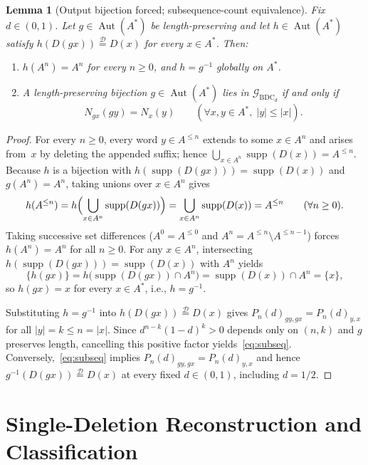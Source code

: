 \documentclass[11pt]{article}
\theoremstyle{plain}
\newtheorem{lemma}[theorem]{Lemma}
\theoremstyle{definition}
\theoremstyle{remark}
\DeclareMathOperator{\Aut}{Aut}
\DeclareMathOperator{\supp}{supp}
\DeclareMathOperator{\BDC}{BDC}
\newcommand{\eqdist}{\stackrel{\mathcal{D}}{=}}
\begin{document}
\begin{lemma}[Output bijection forced; subsequence-count equivalence]\label{lem:forced-h}
Fix $d \in (0, 1)$. Let $g \in \Aut(A^*)$ be length-preserving and let $h \in \Aut(A^*)$ satisfy $h(D(gx)) \eqdist D(x)$ for every $x \in A^*$. Then:
\begin{enumerate}[label=\textup{(\arabic*)},nosep]
\item $h(A^n) = A^n$ for every $n \ge 0$, and $h = g^{-1}$ globally on $A^*$.
\item A length-preserving bijection $g \in \Aut(A^*)$ lies in $\mathcal{G}_{\BDC_d}$ if and only if
\begin{equation}\label{eq:subseq}
N_{gx}(gy) = N_x(y) \qquad (\forall x, y \in A^*,\; |y| \le |x|).
\end{equation}
\end{enumerate}
\end{lemma}

\begin{proof}
For every $n \ge 0$, every word $y \in A^{\le n}$ extends to some $x \in A^n$ and arises from~$x$ by deleting the appended suffix; hence $\bigcup_{x \in A^n} \supp(D(x)) = A^{\le n}$. Because $h$ is a bijection with $h(\supp(D(gx))) = \supp(D(x))$ and $g(A^n) = A^n$, taking unions over $x \in A^n$ gives
\[
h(A^{\le n}) = h\Bigl(\bigcup_{x \in A^n} \supp(D(gx))\Bigr) = \bigcup_{x \in A^n} \supp(D(x)) = A^{\le n} \qquad (\forall n \ge 0).
\]
Taking successive set differences ($A^0 = A^{\le 0}$ and $A^n = A^{\le n} \setminus A^{\le n-1}$) forces $h(A^n) = A^n$ for all $n \ge 0$. For any $x \in A^n$, intersecting $h(\supp(D(gx))) = \supp(D(x))$ with $A^n$ yields
\[
\{h(gx)\} = h\bigl(\supp(D(gx)) \cap A^n\bigr) = \supp(D(x)) \cap A^n = \{x\},
\]
so $h(gx) = x$ for every $x \in A^*$, i.e., $h = g^{-1}$.

Substituting $h = g^{-1}$ into $h(D(gx)) \eqdist D(x)$ gives $P_n(d)_{gy, gx} = P_n(d)_{y, x}$ for all $|y| = k \le n = |x|$. Since $d^{n-k}(1 - d)^k > 0$ depends only on $(n, k)$ and $g$ preserves length, cancelling this positive factor yields~\eqref{eq:subseq}. Conversely,~\eqref{eq:subseq} implies $P_n(d)_{gy, gx} = P_n(d)_{y, x}$ and hence $g^{-1}(D(gx)) \eqdist D(x)$ at every fixed $d \in (0, 1)$, including $d = 1/2$.
\end{proof}

\section{Single-Deletion Reconstruction and Classification}
\end{document}
